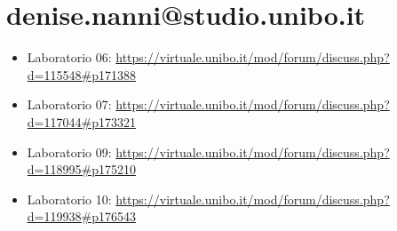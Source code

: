\documentclass[a4paper,12pt]{report}
\begin{document}
\section{denise.nanni@studio.unibo.it}
\begin{itemize}
\item Laboratorio 06: \url{https://virtuale.unibo.it/mod/forum/discuss.php?d=115548\#p171388}
\item Laboratorio 07: \url{https://virtuale.unibo.it/mod/forum/discuss.php?d=117044\#p173321}
\item Laboratorio 09: \url{https://virtuale.unibo.it/mod/forum/discuss.php?d=118995\#p175210}
\item Laboratorio 10: \url{https://virtuale.unibo.it/mod/forum/discuss.php?d=119938\#p176543}
\end{itemize}
\end{document}
